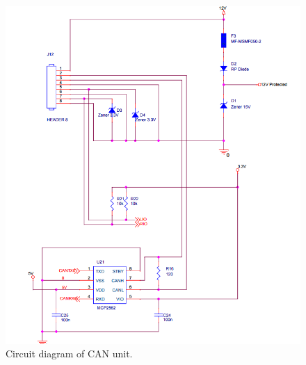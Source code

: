 \begin{figure}[H]
\begin{center}
\includegraphics[width=14cm]{Appendices/can.png}
\end{center}
\caption{Circuit diagram of CAN unit.}
\label{fig:can}
\end{figure}
